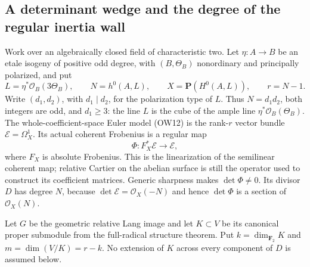 \subsection{A determinant wedge and the degree of the regular inertia wall}

Work over an algebraically closed field of characteristic two. Let
\(\eta:A\to B\) be an etale isogeny of positive odd degree, with
\((B,\Theta_B)\) nonordinary and principally polarized, and put
\[
 L=\eta^*\mathcal O_B(3\Theta_B),\qquad
 N=h^0(A,L),\qquad X=\mathbf P(H^0(A,L)),\qquad r=N-1.
 \tag{DE-WP1}
\]
Write \((d_1,d_2)\), with \(d_1\mid d_2\), for the polarization
type of \(L\). Thus \(N=d_1d_2\), both integers are odd, and
\(d_1\ge3\): the line \(L\) is the cube of the ample line
\(\eta^*\mathcal O_B(\Theta_B)\).
The whole-coefficient-space Euler model (OW12) is the rank-\(r\)
vector bundle \(\mathcal E=\Omega_X^1\). Its actual coherent
Frobenius is a regular map
\[
 \Phi:F_X^*\mathcal E\longrightarrow\mathcal E,
 \tag{DE-WP2}
\]
where \(F_X\) is absolute Frobenius. This is the linearization of
the semilinear coherent map; relative Cartier on the abelian surface
is still the operator used to construct its coefficient matrices.
Generic sharpness makes \(\det\Phi\ne0\). Its divisor \(D\)
has degree \(N\), because
\(\det\mathcal E=\mathcal O_X(-N)\) and hence
\(\det\Phi\) is a section of \(\mathcal O_X(N)\).

Let \(G\) be the geometric relative Lang image and let
\(K\subset V\) be its canonical proper submodule from the full-radical
structure theorem. Put \(k=\dim_{\mathbf F_2}K\) and
\(m=\dim(V/K)=r-k\). No extension of \(K\) across every component
of \(D\) is assumed below.

